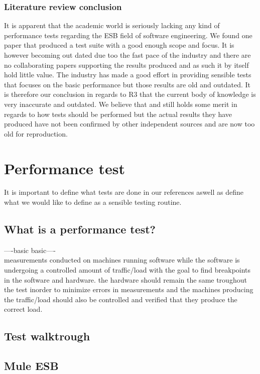 \documentclass{llncs}
\begin{document}
\subsubsection{Literature review conclusion}

It is apparent that the academic world is seriously lacking any kind of performance tests regarding the ESB field of software engineering. We found one paper\cite{Sanjay11} that produced a test suite with a good enough scope and focus. It is however becoming out dated due too the fast pace of the industry and there are no collaborating papers supporting the results produced and as such it by itself hold little value. The industry has made a good effort in providing sensible tests that focuses on the basic performance but those results are old and outdated. 
It is therefore our conclusion in regards to R3 that the current body of knowledge is very inaccurate and outdated. We believe that \cite{Sanjay11} and \cite{Perera07,Perera07R2,Perera07R3,mulesoft08}still holds some merit in regards to how tests should be performed but the actual results they have produced have not been confirmed by other independent sources and are now too old for reproduction.

\section{Performance test}
It is important to define what tests are done in our references aswell as define what we would like to define as a sensible testing routine.
\subsection{What is a performance test?}
----basic basic---- \\
measurements conducted on machines running software while the software is undergoing a controlled amount of traffic/load with the goal to find breakpoints in the software and hardware. the hardware should remain the same troughout the test inorder to minimize errors in measurements and the machines producing the traffic/load should also be controlled and verified that they produce the correct load. 
\subsection{Test walktrough}
	\subsection{Mule ESB}
\end{document}
